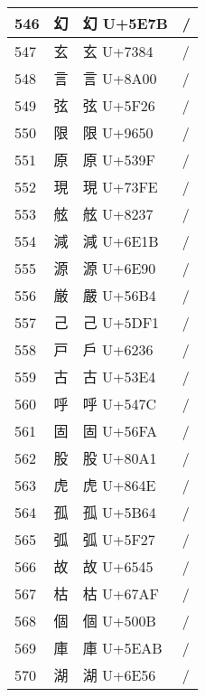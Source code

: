 \documentclass[uplatex,12pt]{jsarticle}
\begin{document}
\begin{longtable}[c]{llp{3cm}l}
  546 & {\huge 幻} &
    {\huge 幻} U+5E7B &
      /  \\ \hline
  547 & {\huge 玄} &
    {\huge 玄} U+7384 &
      /  \\ \hline
  548 & {\huge 言} &
    {\huge 言} U+8A00 &
      /  \\ \hline
  549 & {\huge 弦} &
    {\huge 弦} U+5F26 &
      /  \\ \hline
  550 & {\huge 限} &
    {\huge 限} U+9650 &
      /  \\ \hline
  551 & {\huge 原} &
    {\huge 原} U+539F &
      /  \\ \hline
  552 & {\huge 現} &
    {\huge 現} U+73FE &
      /  \\ \hline
  553 & {\huge 舷} &
    {\huge 舷} U+8237 &
      /  \\ \hline
  554 & {\huge 減} &
    {\huge 減} U+6E1B &
      /  \\ \hline
  555 & {\huge 源} &
    {\huge 源} U+6E90 &
      /  \\ \hline
  556 & {\huge 厳} &
    {\huge 嚴} U+56B4 &
      /  \\ \hline
  557 & {\huge 己} &
    {\huge 己} U+5DF1 &
      /  \\ \hline
  558 & {\huge 戸} &
    {\huge 戶} U+6236 &
      /  \\ \hline
  559 & {\huge 古} &
    {\huge 古} U+53E4 &
      /  \\ \hline
  560 & {\huge 呼} &
    {\huge 呼} U+547C &
      /  \\ \hline
  561 & {\huge 固} &
    {\huge 固} U+56FA &
      /  \\ \hline
  562 & {\huge 股} &
    {\huge 股} U+80A1 &
      /  \\ \hline
  563 & {\huge 虎} &
    {\huge 虎} U+864E &
      /  \\ \hline
  564 & {\huge 孤} &
    {\huge 孤} U+5B64 &
      /  \\ \hline
  565 & {\huge 弧} &
    {\huge 弧} U+5F27 &
      /  \\ \hline
  566 & {\huge 故} &
    {\huge 故} U+6545 &
      /  \\ \hline
  567 & {\huge 枯} &
    {\huge 枯} U+67AF &
      /  \\ \hline
  568 & {\huge 個} &
    {\huge 個} U+500B &
      /  \\ \hline
  569 & {\huge 庫} &
    {\huge 庫} U+5EAB &
      /  \\ \hline
  570 & {\huge 湖} &
    {\huge 湖} U+6E56 &
      /  \\ \hline

\end{longtable}
\end{document}
